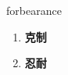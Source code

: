 
\begin{frame}
{\huge forbearance}
\begin{center}
\begin{enumerate}\Large
  \item \textbf{克制}
  \item \textbf{忍耐}
\end{enumerate}
\end{center}
\end{frame}
